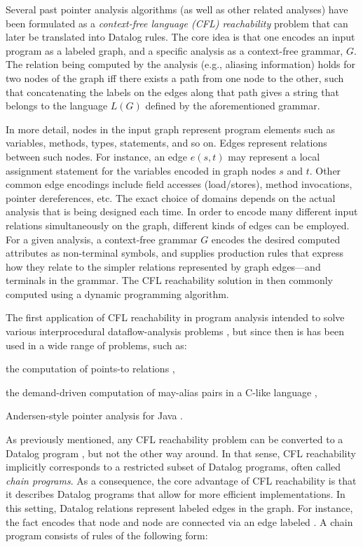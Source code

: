 Several past pointer analysis algorithms (as well as other related analyses) have been formulated as a \emph{context-free language (CFL) reachability} problem that can later be translated into Datalog rules. The core idea is that one encodes an input program as a labeled graph, and a specific analysis as a context-free grammar, $G$. The relation being computed by the analysis (e.g., aliasing information) holds for two nodes of the graph iff there exists a path from one node to the other, such that concatenating the labels on the edges along that path gives a string that belongs to the language $L(G)$ defined by the aforementioned grammar.

In more detail, nodes in the input graph represent program elements such as variables, methods, types, statements, and so on. Edges represent relations between such nodes. For instance, an edge $e(s, t)$ may represent a local assignment statement for the variables encoded in graph nodes $s$ and $t$. Other common edge encodings include field accesses (load/stores), method invocations, pointer dereferences, etc. The exact choice of domains depends on the actual analysis that is being designed each time. In order to encode many different input relations simultaneously on the graph, different kinds of edges can be employed. For a given analysis, a context-free grammar $G$ encodes the desired computed attributes as non-terminal symbols, and supplies production rules that express how they relate to the simpler relations represented by graph edges---and terminals in the grammar. The CFL reachability solution in then commonly computed using a dynamic programming algorithm.

The first application of CFL reachability in program analysis intended to solve various interprocedural dataflow-analysis problems \todo{}, but since then is has been used in a wide range of problems, such as:
\begin{inparaenum}[(1)]
\item the computation of points-to relations \todo{},
\item the demand-driven computation of may-alias pairs in a C-like language \todo{},
\item Andersen-style pointer analysis for Java \todo{}.
\end{inparaenum}

As previously mentioned, any CFL reachability problem can be converted to a Datalog program \todo{}, but not the other way around. In that sense, CFL reachability implicitly corresponds to a restricted subset of Datalog programs, often called \emph{chain programs}. As a consequence, the core advantage of CFL reachability is that it describes Datalog programs that allow for more efficient implementations. In this setting, Datalog relations represent labeled edges in the graph. For instance, the fact  encodes that node  and node  are connected via an edge labeled . A chain program consists of rules of the following form:

